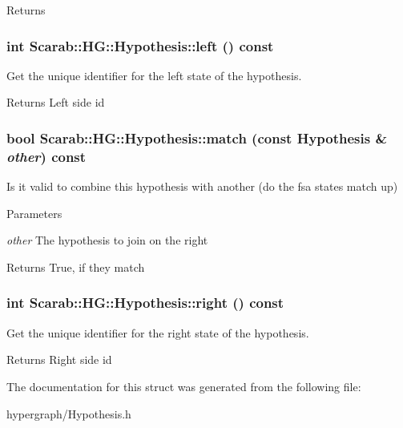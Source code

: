 \begin{DoxyReturn}{Returns}

\end{DoxyReturn}
\hypertarget{struct_scarab_1_1_h_g_1_1_hypothesis_ac428cffa80bad102222f58463bfba7e5}{
\subsubsection[{left}]{\setlength{\rightskip}{0pt plus 5cm}int Scarab::HG::Hypothesis::left () const}}
\label{struct_scarab_1_1_h_g_1_1_hypothesis_ac428cffa80bad102222f58463bfba7e5}
Get the unique identifier for the left state of the hypothesis.

\begin{DoxyReturn}{Returns}
Left side id 
\end{DoxyReturn}
\hypertarget{struct_scarab_1_1_h_g_1_1_hypothesis_a698008183fc3863a0c03ba0c3e5960d1}{
\subsubsection[{match}]{\setlength{\rightskip}{0pt plus 5cm}bool Scarab::HG::Hypothesis::match (const {\bf Hypothesis} \& {\em other}) const}}
\label{struct_scarab_1_1_h_g_1_1_hypothesis_a698008183fc3863a0c03ba0c3e5960d1}
Is it valid to combine this hypothesis with another (do the fsa states match up) 
\begin{DoxyParams}{Parameters}
\item[{\em other}]The hypothesis to join on the right\end{DoxyParams}
\begin{DoxyReturn}{Returns}
True, if they match 
\end{DoxyReturn}
\hypertarget{struct_scarab_1_1_h_g_1_1_hypothesis_a6c026d211fd4f4875216fc179a78e879}{
\subsubsection[{right}]{\setlength{\rightskip}{0pt plus 5cm}int Scarab::HG::Hypothesis::right () const}}
\label{struct_scarab_1_1_h_g_1_1_hypothesis_a6c026d211fd4f4875216fc179a78e879}
Get the unique identifier for the right state of the hypothesis.

\begin{DoxyReturn}{Returns}
Right side id 
\end{DoxyReturn}


The documentation for this struct was generated from the following file:\begin{DoxyCompactItemize}
\item 
hypergraph/Hypothesis.h\end{DoxyCompactItemize}
